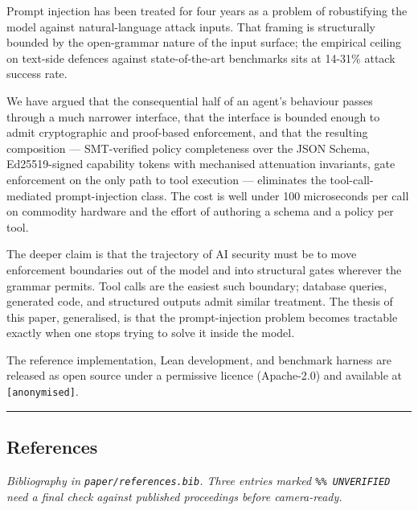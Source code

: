 Prompt injection has been treated for four years as a problem of
robustifying the model against natural-language attack inputs. That
framing is structurally bounded by the open-grammar nature of the input
surface; the empirical ceiling on text-side defences against
state-of-the-art benchmarks sits at 14-31\% attack success rate.

We have argued that the consequential half of an agent's behaviour
passes through a much narrower interface, that the interface is bounded
enough to admit cryptographic and proof-based enforcement, and that the
resulting composition --- SMT-verified policy completeness over the JSON
Schema, Ed25519-signed capability tokens with mechanised attenuation
invariants, gate enforcement on the only path to tool execution ---
eliminates the tool-call-mediated prompt-injection class. The cost is
well under 100 microseconds per call on commodity hardware and the
effort of authoring a schema and a policy per tool.

The deeper claim is that the trajectory of AI security must be to move
enforcement boundaries out of the model and into structural gates
wherever the grammar permits. Tool calls are the easiest such boundary;
database queries, generated code, and structured outputs admit similar
treatment. The thesis of this paper, generalised, is that the
prompt-injection problem becomes tractable exactly when one stops trying
to solve it inside the model.

The reference implementation, Lean development, and benchmark harness
are released as open source under a permissive licence (Apache-2.0) and
available at \texttt{{[}anonymised{]}}.

\begin{center}\rule{0.5\linewidth}{0.5pt}\end{center}

\subsection{References}\label{references}

\emph{Bibliography in \texttt{paper/references.bib}. Three entries
marked \texttt{\%\%\ UNVERIFIED} need a final check against published
proceedings before camera-ready.}


